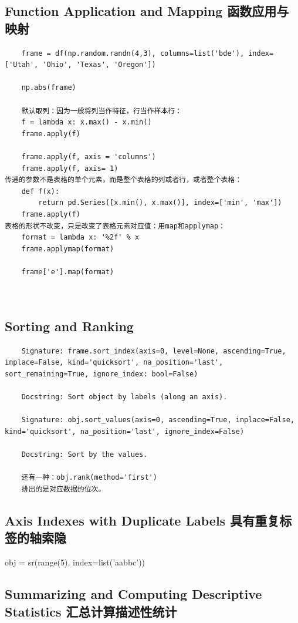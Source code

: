 \documentclass{article}
\begin{document}
\subsection{Function Application and Mapping 函数应用与映射}
\begin{lstlisting}
	frame = df(np.random.randn(4,3), columns=list('bde'), index=['Utah', 'Ohio', 'Texas', 'Oregon'])
	
	np.abs(frame)
	
	默认取列：因为一般将列当作特征，行当作样本行：
	f = lambda x: x.max() - x.min()
	frame.apply(f)
	
	frame.apply(f, axis = 'columns')
	frame.apply(f, axis= 1)
传递的参数不是表格的单个元素，而是整个表格的列或者行，或者整个表格：
	def f(x):
		return pd.Series([x.min(), x.max()], index=['min', 'max'])
	frame.apply(f)
表格的形状不改变，只是改变了表格元素对应值：用map和applymap：
	format = lambda x: '%2f' % x
	frame.applymap(format)
	
	frame['e'].map(format)
	
	
\end{lstlisting}

\subsection{Sorting and Ranking}

\begin{lstlisting}
	Signature: frame.sort_index(axis=0, level=None, ascending=True, inplace=False, kind='quicksort', na_position='last', sort_remaining=True, ignore_index: bool=False)
	
	Docstring: Sort object by labels (along an axis).
	
	Signature: obj.sort_values(axis=0, ascending=True, inplace=False, kind='quicksort', na_position='last', ignore_index=False)
	
	Docstring: Sort by the values.
	
	还有一种：obj.rank(method='first')
	排出的是对应数据的位次。
\end{lstlisting}

\subsection{Axis Indexes with Duplicate Labels 具有重复标签的轴索隐}
obj = sr(range(5), index=list('aabbc'))



\subsection{Summarizing and Computing Descriptive Statistics 汇总计算描述性统计}
\end{document}
